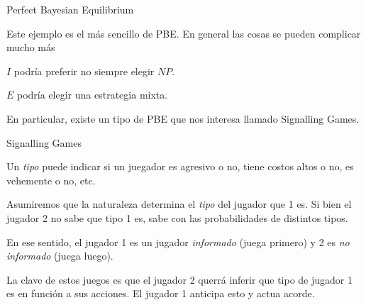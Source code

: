 \documentclass[notes, 11pt]{beamer} %
\newenvironment{wideitemize}{\itemize\addtolength{\itemsep}{10pt}}{\enditemize}
\begin{document}
\begin{frame}{Perfect Bayesian Equilibrium}
	\begin{wideitemize}
		\item<1-> Este ejemplo es el m\'as sencillo de PBE. En general las cosas se pueden complicar mucho m\'as
		\begin{wideitemize}
			\item<2->[--] $I$ podr\'ia preferir no siempre elegir $NP$.
			\item<3->[--] $E$ podr\'ia elegir una estrategia mixta.
		\end{wideitemize}
		\item<4-> En particular, existe un tipo de PBE que nos interesa llamado Signalling Games.
	\end{wideitemize}
\end{frame}

\begin{frame}{Signalling Games}
	\begin{wideitemize}
		\item<3-> Un \textit{tipo} puede indicar si un juegador es agresivo o no, tiene costos altos o no, es vehemente o no, etc.
		\item<4-> Asumiremos que la naturaleza determina el \textit{tipo} del jugador que 1 es. Si bien el jugador 2 no sabe que tipo 1 es, sabe con las probabilidades de distintos tipos.
		\item<5-> En ese sentido, el jugador 1 es un jugador \textit{informado} (juega primero) y 2 es \textit{no informado} (juega luego).
		\item<6-> La clave de estos juegos es que el jugador 2 querr\'a inferir que tipo de jugador 1 es en funci\'on a sus acciones. El jugador 1 anticipa esto y actua acorde.
	\end{wideitemize}
\end{frame}
\end{document}
